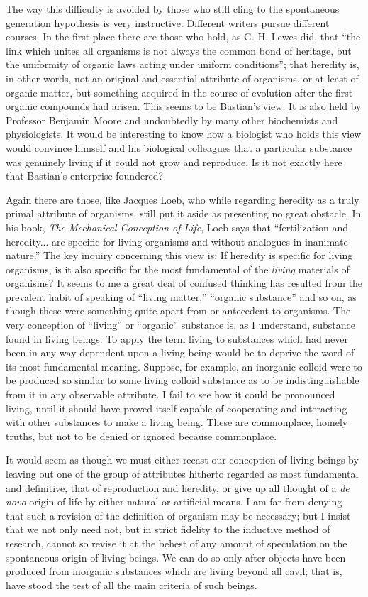 \documentclass[a4paper, 11pt, oneside, polutonikogreek, english]{article}
\begin{document}
The way this difficulty is avoided by those who still cling to the spontaneous generation hypothesis is very instructive. Different writers pursue different courses. In the first place there are those who hold, as G. H. Lewes did, that ``the link which unites all organisms is not always the common bond of heritage, but the uniformity of organic laws acting under uniform conditions''; that heredity is, in other words, not an original and essential attribute of organisms, or at least of organic matter, but something acquired in the course of evolution after the first organic compounds had arisen. This seems to be Bastian's view. It is also held by Professor Benjamin Moore and undoubtedly by many other biochemists and physiologists. It would be interesting to know how a biologist who holds this view would convince himself and his biological colleagues that a particular substance was genuinely living if it could not grow and reproduce. Is it not exactly here that Bastian's enterprise foundered?

Again there are those, like Jacques Loeb, who while regarding heredity as a truly primal attribute of organisms, still put it aside as presenting no great obstacle. In his book, \emph{The Mechanical Conception of Life}, Loeb says that ``fertilization and heredity... are specific for living organisms and without analogues in inanimate nature.'' The key inquiry concerning this view is: If heredity is specific for living organisms, is it also specific for the most fundamental of the \emph{living} materials of organisms? It seems to me a great deal of confused thinking has resulted from the prevalent habit of speaking of ``living matter,'' ``organic substance'' and so on, as though these were something quite apart from or antecedent to organisms. The very conception of ``living'' or ``organic'' substance is, as I understand, substance found in living beings. To apply the term living to substances which had never been in any way dependent upon a living being would be to deprive the word of its most fundamental meaning. Suppose, for example, an inorganic colloid were to be produced so similar to some living colloid substance as to be indistinguishable from it in any observable attribute. I fail to see how it could be pronounced living, until it should have proved itself capable of cooperating and interacting with other substances to make a living being. These are commonplace, homely truths, but not to be denied or ignored because commonplace.

It would seem as though we must either recast our conception of living beings by leaving out one of the group of attributes hitherto regarded as most fundamental and definitive, that of reproduction and heredity, or give up all thought of a \emph{de novo} origin of life by either natural or artificial means. I am far from denying that such a revision of the definition of organism may be necessary; but I insist that we not only need not, but in strict fidelity to the inductive method of research, cannot so revise it at the behest of any amount of speculation on the spontaneous origin of living beings. We can do so only after objects have been produced from inorganic substances which are living beyond all cavil; that is, have stood the test of all the main criteria of such beings.
\end{document}
